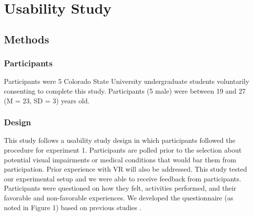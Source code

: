 \documentclass[sigconf]{acmart}
\begin{document}

\section{Usability Study}
\subsection{Methods}

\subsubsection{Participants}
Participants were 5 Colorado State University undergraduate students voluntarily consenting to complete this study. Participants (5 male) were between 19 and 27 (M = 23, SD = 3) years old.

\subsubsection{Design}
This study follows a usability study design in which participants followed the procedure for experiment 1. Participants are polled prior to the selection about potential visual impairments or medical conditions that would bar them from participation. Prior experience with VR will also be addressed. This study tested our experimental setup and we were able to receive feedback from participants. Participants were questioned on how they felt, activities performed, and their favorable and non-favorable experiences. We developed the questionnaire (as noted in Figure 1) based on previous studies \cite{kim18, Hunt18, han11, palmisano17, farmani20}.
\end{document}
